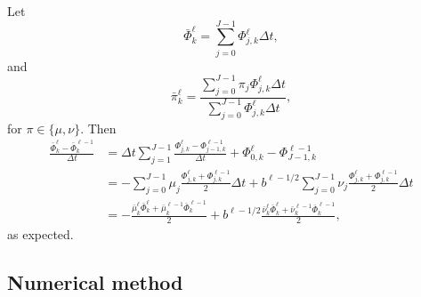 \documentclass{jpmarticle}
\begin{document}
Let
\begin{equation}
  \bar{\Phi}_k^{\ell}
  = \sum_{j = 0}^{J - 1} \Phi_{j, k}^{\ell} \Delta t,
\end{equation}
and
\begin{equation}
  \bar{\pi}_k^{\ell}
  = \frac{\sum_{j = 0}^{J - 1} \pi_j \Phi_{j, k}^{\ell} \Delta t}
  {\sum_{j = 0}^{J - 1} \Phi_{j, k}^{\ell} \Delta t},
\end{equation}
for $\pi \in \{\mu, \nu\}$. Then
\begin{equation}
  \begin{split}
    \frac{\bar{\Phi}_k^{\ell} - \bar{\Phi}_k^{\ell - 1}}{\Delta t}
    &= \Delta t \sum_{j = 1}^{J - 1}
    \frac{\Phi_{j, k}^{\ell} - \Phi_{j - 1, k}^{\ell - 1}}{\Delta t}
    + \Phi_{0, k}^{\ell} -  \Phi_{J - 1, k}^{\ell - 1}
    \\
    &= - \sum_{j = 0}^{J - 1} \mu_j
    \frac{\Phi_{j, k}^{\ell} + \Phi_{j, k}^{\ell - 1}}{2}
    \Delta t
    + b^{\ell - 1 / 2} \sum_{j = 0}^{J - 1} \nu_j
    \frac{\Phi_{j, k}^{\ell} + \Phi_{j, k}^{\ell - 1}}{2}
    \Delta t
    \\
    &= - \frac{\bar{\mu}_k^{\ell} \bar{\Phi}_k^{\ell}
      + \bar{\mu}_k^{\ell - 1} \bar{\Phi}_k^{\ell - 1}}{2}
    + b^{\ell - 1 / 2}
    \frac{\bar{\nu}_k^{\ell} \bar{\Phi}_k^{\ell}
      + \bar{\nu}_k^{\ell - 1} \bar{\Phi}_k^{\ell - 1}}{2},
  \end{split}
\end{equation}
as expected.


\subsection{Numerical method}
\end{document}
